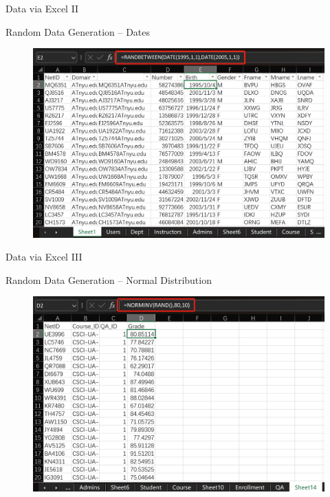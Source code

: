 \documentclass[a4paper,10pt]{beamer}
\begin{document}
\begin{frame}{Data via Excel II}
\begin{block}{Random Data Generation -- Dates}
\begin{figure}[H]
    \includegraphics[width=\textwidth]{Data2.png}
\end{figure}
\end{block}
\end{frame}

\begin{frame}{Data via Excel III}
\begin{block}{Random Data Generation -- Normal Distribution}
\begin{figure}[H]
    \includegraphics[width=\textwidth]{Data3.png}
\end{figure}
\end{block}
\end{frame}
\end{document}
